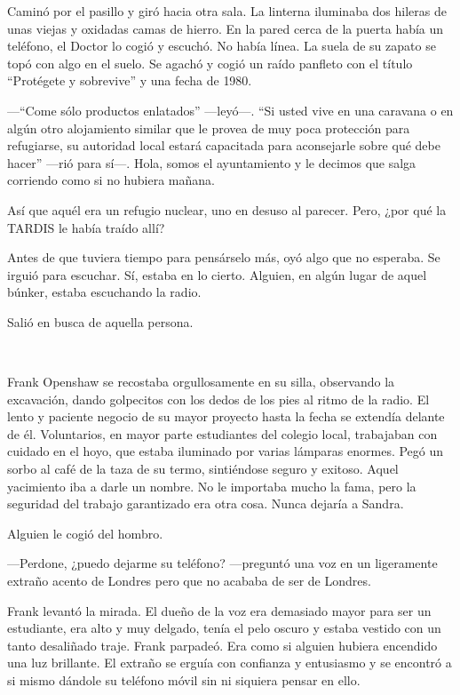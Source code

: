 Caminó por el pasillo y giró hacia otra sala. La linterna iluminaba dos
hileras de unas viejas y oxidadas camas de hierro. En la pared cerca de
la puerta había un teléfono, el Doctor lo cogió y escuchó. No había
línea. La suela de su zapato se topó con algo en el suelo. Se agachó y
cogió un raído panfleto con el título ``Protégete y sobrevive'' y una
fecha de 1980.

---``Come sólo productos enlatados'' ---leyó---. ``Si usted vive en una
caravana o en algún otro alojamiento similar que le provea de muy poca
protección para refugiarse, su autoridad local estará capacitada para
aconsejarle sobre qué debe hacer'' ---rió para sí---. Hola, somos el
ayuntamiento y le decimos que salga corriendo como si no hubiera mañana.

Así que aquél era un refugio nuclear, uno en desuso al parecer. Pero,
¿por qué la TARDIS le había traído allí?

Antes de que tuviera tiempo para pensárselo más, oyó algo que no
esperaba. Se irguió para escuchar. Sí, estaba en lo cierto. Alguien, en
algún lugar de aquel búnker, estaba escuchando la radio.

Salió en busca de aquella persona.

~

Frank Openshaw se recostaba orgullosamente en su silla, observando la
excavación, dando golpecitos con los dedos de los pies al ritmo de la
radio. El lento y paciente negocio de su mayor proyecto hasta la fecha
se extendía delante de él. Voluntarios, en mayor parte estudiantes del
colegio local, trabajaban con cuidado en el hoyo, que estaba iluminado
por varias lámparas enormes. Pegó un sorbo al café de la taza de su
termo, sintiéndose seguro y exitoso. Aquel yacimiento iba a darle un
nombre. No le importaba mucho la fama, pero la seguridad del trabajo
garantizado era otra cosa. Nunca dejaría a Sandra.

Alguien le cogió del hombro.

---Perdone, ¿puedo dejarme su teléfono? ---preguntó una voz en un
ligeramente extraño acento de Londres pero que no acababa de ser de
Londres.

Frank levantó la mirada. El dueño de la voz era demasiado mayor para ser
un estudiante, era alto y muy delgado, tenía el pelo oscuro y estaba
vestido con un tanto desaliñado traje. Frank parpadeó. Era como si
alguien hubiera encendido una luz brillante. El extraño se erguía con
confianza y entusiasmo y se encontró a si mismo dándole su teléfono
móvil sin ni siquiera pensar en ello.

